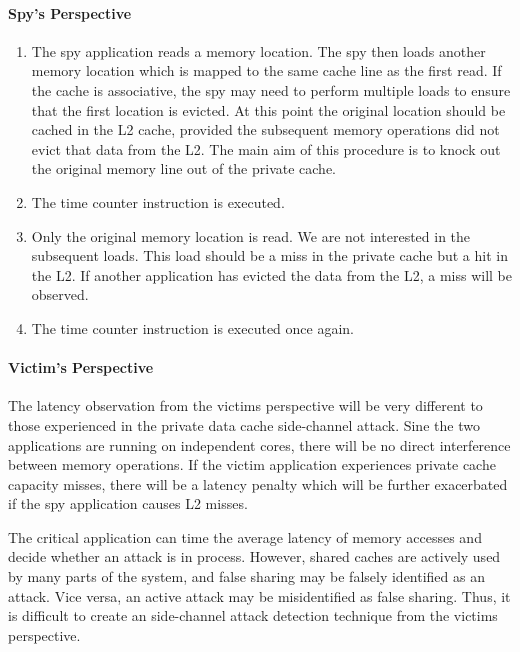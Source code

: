 		\paragraph{Spy's Perspective}
		\begin{enumerate}
			\item The spy application reads a memory location. The spy then loads another memory location which is mapped to the same cache line as the first read. If the cache is associative, the spy may need to perform multiple loads to ensure that the first location is evicted. At this point the original location should be cached in the L2 cache, provided the subsequent memory operations did not evict that data from the L2. The main aim of this procedure is to knock out the original memory line out of the private cache.
			\item The time counter instruction is executed.
			\item Only the original memory location is read. We are not interested in the subsequent loads. This load should be a miss in the private cache but a hit in the L2. If another application has evicted the data from the L2, a miss will be observed.
			\item The time counter instruction is executed once again.
		\end{enumerate}

		\paragraph{Victim's Perspective}
			The latency observation from the victims perspective will be very different to those experienced in the private data cache side-channel attack. Sine the two applications are running on independent cores, there will be no direct interference between memory operations. If the victim application experiences private cache capacity misses, there will be a latency penalty which will be further exacerbated if the spy application causes L2 misses.

			The critical application can time the average latency of memory accesses and decide whether an attack is in process. However, shared caches are actively used by many parts of the system, and false sharing may be falsely identified as an attack. Vice versa, an active attack may be misidentified as false sharing. Thus, it is difficult to create an side-channel attack detection technique from the victims perspective. 
	
